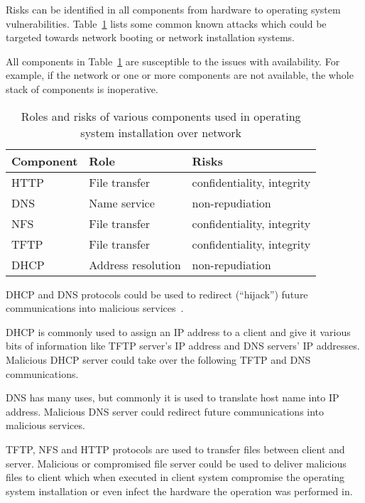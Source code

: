 Risks can be identified in all components from hardware to operating
system vulnerabilities. Table~\ref{tab:risks_table} lists some
common known attacks which could be targeted towards network booting
or network installation systems.

All components in Table~\ref{tab:risks_table} are susceptible to the
issues with availability. For example, if the network or one or more
components are not available, the whole stack of components is
inoperative.

\begin{table}[!ht]
  \def\arraystretch{1.1}%
  \begin{center}
    \caption{Roles and risks of various components used in operating
      system installation over network\label{tab:risks_table}}
    \begin{tabular}{| l | l | l |}
      \hline
      Component   & Role               & Risks                      \\
      \hline
      HTTP        & File transfer      & confidentiality, integrity \\
      DNS         & Name service       & non-repudiation            \\
      NFS         & File transfer      & confidentiality, integrity \\
      TFTP        & File transfer      & confidentiality, integrity \\
      DHCP        & Address resolution & non-repudiation            \\
      \hline
    \end{tabular}
  \end{center}
\end{table}


DHCP and DNS protocols could be used to redirect (``hijack'') future
communications into malicious
services~\cite{green2005dns}\cite{ornaghi2003man}.

DHCP is commonly used to assign an IP address to a client and give it
various bits of information like TFTP server's IP address and DNS
servers' IP addresses. Malicious DHCP server could take over the
following TFTP and DNS communications.

DNS has many uses, but commonly it is used to translate host name into
IP address. Malicious DNS server could redirect future communications
into malicious services.

TFTP, NFS and HTTP protocols are used to transfer files between client
and server. Malicious or compromised file server could be used to
deliver malicious files to client which when executed in client system
compromise the operating system installation or even infect the
hardware the operation was performed in.

